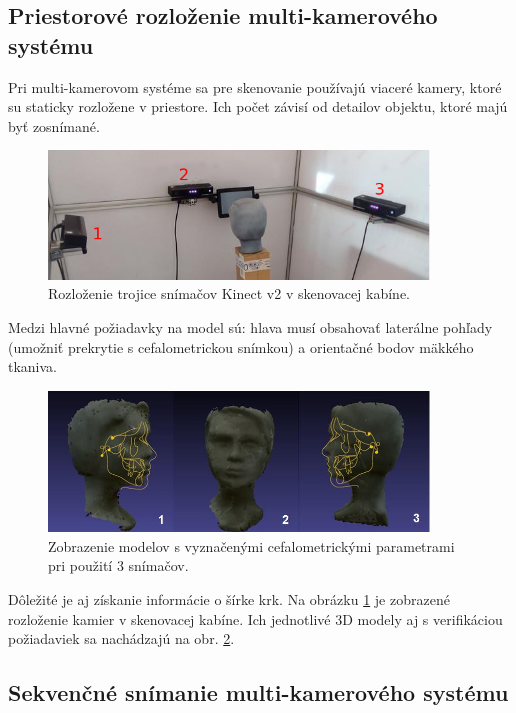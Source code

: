 \subsection{Priestorové rozloženie multi-kamerového systému}

Pri multi-kamerovom systéme sa pre skenovanie používajú viaceré kamery, ktoré su staticky rozložene v priestore. Ich počet závisí od detailov objektu, ktoré majú byť zosnímané.

\begin{figure}[H]
	\centering
	\includegraphics[width=0.9\textwidth]{figures/multicam_placement.png}
	\caption{Rozloženie trojice snímačov Kinect v2 v skenovacej kabíne.}
	\label{fig:multicam:placement}
\end{figure}

Medzi hlavné požiadavky na model sú: hlava musí obsahovať laterálne pohľady (umožniť prekrytie s cefalometrickou snímkou) a orientačné bodov mäkkého tkaniva.

\begin{figure}[H]
	\centering
	\includegraphics[width=0.9\textwidth]{figures/multicam_placement_scans3.png}
	\caption{Zobrazenie modelov s vyznačenými cefalometrickými parametrami pri použití 3 snímačov. }
	\label{fig:multicam:models}
\end{figure}

Dôležité je aj získanie informácie o šírke krk. Na obrázku \ref{fig:multicam:placement} je zobrazené rozloženie kamier v skenovacej kabíne. Ich jednotlivé 3D modely aj s verifikáciou požiadaviek sa nachádzajú na obr. \ref{fig:multicam:models}. 



\subsection{Sekvenčné snímanie multi-kamerového systému}

